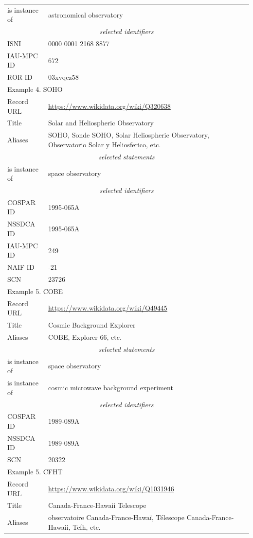 \documentclass[11pt,a4paper]{ivoa}
\begin{document}
\begin{longtable}{p{}p{}}
is instance of & astronomical observatory \\
\multicolumn{2}{c}{\sl selected identifiers}\\
ISNI       & 0000 0001 2168 8877\\
IAU-MPC ID & 672\\
ROR ID     & 03xvqcz58\\
\hline
\hline
\multicolumn{2}{l}{Example 4. SOHO}\\
\hline
Record URL & \url{https://www.wikidata.org/wiki/Q320638}\\
Title      & Solar and Heliospheric Observatory\\
Aliases    & SOHO, Sonde SOHO, Solar Heliospheric Observatory, Observatorio Solar y Heliosferico, etc.\\
\multicolumn{2}{c}{\sl selected statements}\\
is instance of & space observatory \\
\multicolumn{2}{c}{\sl selected identifiers}\\
COSPAR ID  & 1995-065A \\
NSSDCA ID  & 1995-065A \\
IAU-MPC ID & 249\\
NAIF ID    & -21\\
SCN        & 23726\\
\hline
\hline
\multicolumn{2}{l}{Example 5. COBE}\\
\hline
Record URL & \url{https://www.wikidata.org/wiki/Q49445}\\
Title      & Cosmic Background Explorer\\
Aliases    & COBE, Explorer 66, etc.\\
\multicolumn{2}{c}{\sl selected statements}\\
is instance of & space observatory \\
is instance of & cosmic microwave background experiment \\
\multicolumn{2}{c}{\sl selected identifiers}\\
COSPAR ID  & 1989-089A \\
NSSDCA ID  & 1989-089A \\
SCN        & 20322\\
\hline
\hline
\multicolumn{2}{l}{Example 5. CFHT}\\
\hline
Record URL & \url{https://www.wikidata.org/wiki/Q1031946}\\
Title      & Canada-France-Hawaii Telescope\\
Aliases    & observatoire Canada-France-Hawa\"i, T\'elescope Canada-France-Hawaii, Tcfh, etc.\\

\end{longtable}
\end{document}
